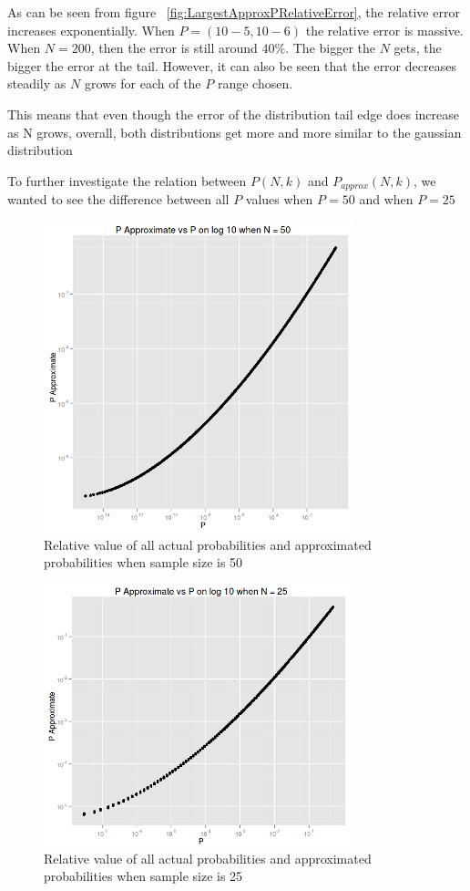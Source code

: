 \documentclass[12pt]{article}
\begin{document}
As can be seen from figure ~\ref{fig:LargestApproxPRelativeError}, the relative error increases exponentially. When $P = (10-5 , 10-6)$ the relative error is massive. When $N=200$, then the error is still around $40\%$. The bigger the $N$ gets, the bigger the error at the tail. However, it can also be seen that the error decreases steadily as $N$ grows for each of the $P$ range chosen.

This means that even though the error of the distribution tail edge does increase as N grows, overall, both distributions get more and more similar to the gaussian distribution

To further investigate the relation between $P(N, k)$ and $P_{approx}(N, k)$, we wanted to see the difference between all $P$ values when $P = 50$ and when $P = 25$

\begin{figure}[!h]
	\centering
  \includegraphics[width=0.8\textwidth]{PvsP50}
	\caption{Relative value of all actual probabilities and approximated probabilities when sample size is 50}
	\label{fig:PvsP50}
\end{figure}

\begin{figure}[!h]
	\centering
  \includegraphics[width=0.8\textwidth]{PvsP25}
	\caption{Relative value of all actual probabilities and approximated probabilities when sample size is 25}
	\label{fig:PvsP25}
\end{figure}
\end{document}
